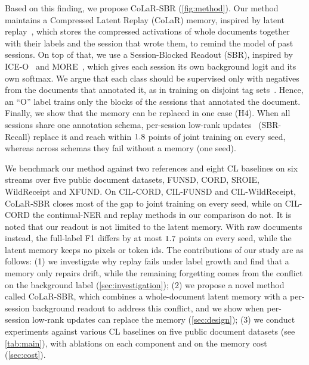 \documentclass[10pt,twocolumn,letterpaper]{article}
\begin{document}
Based on this finding, we propose CoLaR-SBR (\cref{fig:method}). Our method maintains a Compressed Latent Replay (CoLaR) memory, inspired by latent replay~\citep{hayes2020remind,pellegrini2020latent}, which stores the compressed activations of whole documents together with their labels and the session that wrote them, to remind the model of past sessions. On top of that, we use a Session-Blocked Readout (SBR), inspired by ICE-O~\citep{liu2023ice} and MORE~\citep{kim2022more}, which gives each session its own background logit and its own softmax. We argue that each class should be supervised only with negatives from the documents that annotated it, as in training on disjoint tag sets~\citep{greenberg2018marginal}. Hence, an ``O'' label trains only the blocks of the sessions that annotated the document. Finally, we show that the memory can be replaced in one case (H4). When all sessions share one annotation schema, per-session low-rank updates~\citep{hu2022lora} (SBR-Recall) replace it and reach within $1.8$ points of joint training on every seed, whereas across schemas they fail without a memory (one seed).

We benchmark our method against two references and eight CL baselines on six streams over five public document datasets, FUNSD, CORD, SROIE, WildReceipt and XFUND. On CIL-CORD, CIL-FUNSD and CIL-WildReceipt, CoLaR-SBR closes most of the gap to joint training on every seed, while on CIL-CORD the continual-NER and replay methods in our comparison do not. It is noted that our readout is not limited to the latent memory. With raw documents instead, the full-label F1 differs by at most $1.7$ points on every seed, while the latent memory keeps no pixels or token ids. The contributions of our study are as follows: (1) we investigate why replay fails under label growth and find that a memory only repairs drift, while the remaining forgetting comes from the conflict on the background label (\cref{sec:investigation}); (2) we propose a novel method called CoLaR-SBR, which combines a whole-document latent memory with a per-session background readout to address this conflict, and we show when per-session low-rank updates can replace the memory (\cref{sec:design}); (3) we conduct experiments against various CL baselines on five public document datasets (see \cref{tab:main}), with ablations on each component and on the memory cost (\cref{sec:cost}).

\begin{table}[t]
\centering\footnotesize
\setlength{\tabcolsep}{3pt}
\caption{\textbf{The hypothesis ladder} on CIL-CORD with LayoutLMv3, unless stated (AF: average forgetting, mean over seeds; other cells: mean $\pm$ s.d. over three seeds; $^{n=k}$: $k$ seeds; $^\dagger$legacy protocol). $^{r}$Oracle: stored documents relabelled with their true labels (\cref{sec:h1}). $^{e}$ER also trains every layer and keeps $200$ raw documents (\cref{sec:h0}). $^{w}$Trains every layer. The pre-session row of H1 also tests H2.}
\label{tab:ladder}

\end{table}
\end{document}
